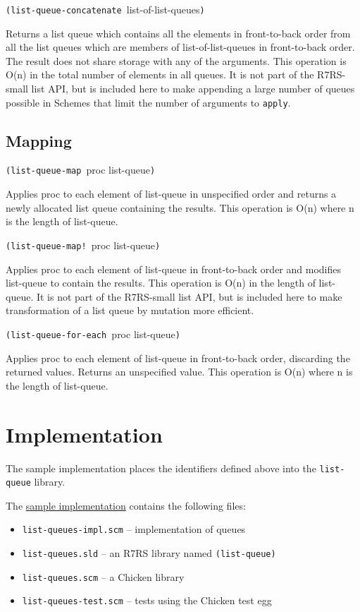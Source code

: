 \texttt{(list-queue-concatenate\ }list-of-list-queues\texttt{)}

Returns a list queue which contains all the elements in front-to-back
order from all the list queues which are members of list-of-list-queues
in front-to-back order. The result does not share storage with any of
the arguments. This operation is O(n) in the total number of elements in
all queues. It is not part of the R7RS-small list API, but is included
here to make appending a large number of queues possible in Schemes that
limit the number of arguments to \texttt{apply}.

\subsection{Mapping}\label{Mapping}

\texttt{(list-queue-map\ }proc list-queue\texttt{)}

Applies proc to each element of list-queue in unspecified order and
returns a newly allocated list queue containing the results. This
operation is O(n) where n is the length of list-queue.

\texttt{(list-queue-map!\ }proc list-queue\texttt{)}

Applies proc to each element of list-queue in front-to-back order and
modifies list-queue to contain the results. This operation is O(n) in
the length of list-queue. It is not part of the R7RS-small list API, but
is included here to make transformation of a list queue by mutation more
efficient.

\texttt{(list-queue-for-each\ }proc list-queue\texttt{)}

Applies proc to each element of list-queue in front-to-back order,
discarding the returned values. Returns an unspecified value. This
operation is O(n) where n is the length of list-queue.

\section{Implementation}\label{implementation}

The sample implementation places the identifiers defined above into the
\texttt{list-queue} library.

The \href{http://srfi.schemers.org/srfi-117/list-queues.tar.gz}{sample
implementation} contains the following files:

\begin{itemize}
\tightlist
\item
  \texttt{list-queues-impl.scm} -- implementation of queues
\item
  \texttt{list-queues.sld} -- an R7RS library named
  \texttt{(list-queue)}
\item
  \texttt{list-queues.scm} -- a Chicken library
\item
  \texttt{list-queues-test.scm} -- tests using the Chicken test egg
\end{itemize}

